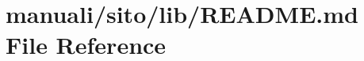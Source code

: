 \hypertarget{manuali_2sito_2lib_2README_8md}{}\section{manuali/sito/lib/\+R\+E\+A\+D\+ME.md File Reference}
\label{manuali_2sito_2lib_2README_8md}
